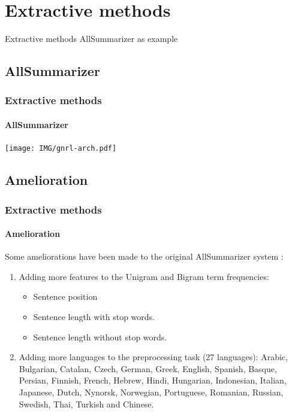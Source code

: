 \documentclass{beamer}
\begin{document}
\section{Extractive methods}

\begin{frame}
\begin{center}
{\Huge Extractive methods}
\vfill
{\Huge AllSummarizer as example}
\end{center}
\end{frame}

\subsection{AllSummarizer}
\begin{frame}
\frametitle{Extractive methods}
\framesubtitle{AllSummarizer}

\begin{center}
\texttt{[image: IMG/gnrl-arch.pdf]}
\end{center}

\end{frame}

\subsection{Amelioration}
\begin{frame}
\frametitle{Extractive methods}
\framesubtitle{Amelioration}
Some ameliorations have been made to the original AllSummarizer system \cite{13-aries-al}:

\begin{enumerate}

\item Adding more features to the Unigram and Bigram term frequencies:
\begin{itemize}
\item Sentence position
\item Sentence length with stop words.
\item Sentence length without stop words.
\end{itemize}

\item Adding more languages to the preprocessing task (27 languages): 
Arabic, Bulgarian, Catalan, Czech, German, Greek, English, Spanish, Basque, Persian, Finnish, French, Hebrew, Hindi, Hungarian, Indonesian, Italian, Japanese, Dutch, Nynorsk, Norwegian, Portuguese, Romanian, Russian, Swedish, Thai, Turkish and Chinese. 

\end{enumerate}

\end{frame}
\end{document}
